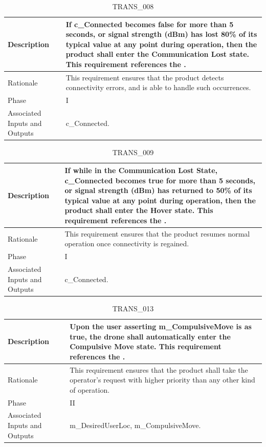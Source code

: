 \documentclass{article}
\begin{document}
\begin{table}[!h]
\begin{center}
\caption {TRANS\_008} 
\label{TRANS_010}
\begin{tabular}{ | m{3cm} | m{11cm} | }
\hline
Description & If c\_Connected becomes false for more than 5 seconds, or signal strength (dBm) has lost 80\% of its typical value at any point during operation, then the product shall enter the Communication Lost state. This requirement references the \nameref{Communication Lost State}. \\
\hline
Rationale & This requirement ensures that the product detects connectivity errors, and is able to handle such occurrences. \\
\hline
Phase & I \\
\hline
Associated Inputs and Outputs & c\_Connected. \\
\hline
\end{tabular}
\end{center}
\end{table}

\begin{table}[!h]
\begin{center}
\caption {TRANS\_009} 
\label{TRANS_011}
\begin{tabular}{ | m{3cm} | m{11cm} | }
\hline
Description & If while in the Communication Lost State, c\_Connected becomes true for more than 5 seconds, or signal strength (dBm) has returned to 50\% of its typical value at any point during operation, then the product shall enter the Hover state. This requirement references the \nameref{Communication Lost State}. \\
\hline
Rationale & This requirement ensures that the product resumes normal operation once connectivity is regained. \\
\hline
Phase & I \\
\hline
Associated Inputs and Outputs & c\_Connected. \\
\hline
\end{tabular}
\end{center}
\end{table}

\begin{table}[!h]
\begin{center}
\caption {TRANS\_013} 
\label{TRANS_012}
\begin{tabular}{ | m{3cm} | m{11cm} | }
\hline
Description & Upon the user asserting m\_CompulsiveMove is as true, the drone shall automatically enter the Compulsive Move state. This requirement references the \nameref{Compulsive Move State}. \\
\hline
Rationale & This requirement ensures that the product shall take the operator's request with higher priority than any other kind of operation. \\
\hline
Phase & II \\
\hline
Associated Inputs and Outputs & m\_DesiredUserLoc, m\_CompulsiveMove. \\
\hline
\end{tabular}
\end{center}
\end{table}
\end{document}
